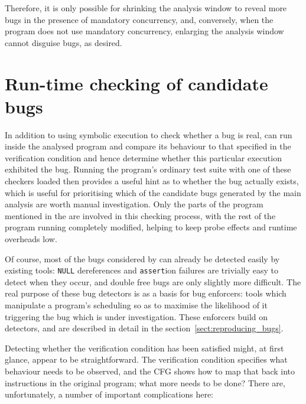 Therefore, it is only possible for shrinking the analysis window to
reveal more bugs in the presence of mandatory concurrency, and,
conversely, when the program does not use mandatory concurrency,
enlarging the analysis window cannot disguise bugs, as desired.


\section{Run-time checking of candidate bugs}

In addition to using symbolic execution to check whether a bug is
real, {\technique} can run inside the analysed program and compare its
behaviour to that specified in the verification condition and hence
determine whether this particular execution exhibited the bug.
Running the program's ordinary test suite with one of these checkers
loaded then provides a useful hint as to whether the bug actually
exists, which is useful for prioritising which of the candidate bugs
generated by the main analysis are worth manual investigation.  Only
the parts of the program mentioned in the {\StateMachines} are
involved in this checking process, with the rest of the program
running completely modified, helping to keep probe effects and runtime
overheads low.

Of course, most of the bugs considered by {\implementation} can
already be detected easily by existing tools: \verb|NULL| dereferences
and \verb|assert|ion failures are trivially easy to detect when they
occur, and double free bugs are only slightly more
difficult\needCite{}.  The real purpose of these bug detectors is as a
basis for bug enforcers: tools which manipulate a program's scheduling
so as to maximise the likelihood of it triggering the bug which is
under investigation.  These enforcers build on detectors, and are
described in detail in the section~\ref{sect:reproducing_bugs}.

Detecting whether the verification condition has been satisfied might,
at first glance, appear to be straightforward.  The verification
condition specifies what behaviour needs to be observed, and the CFG
shows how to map that back into instructions in the original program;
what more needs to be done?  There are, unfortunately, a number of
important complications here:

